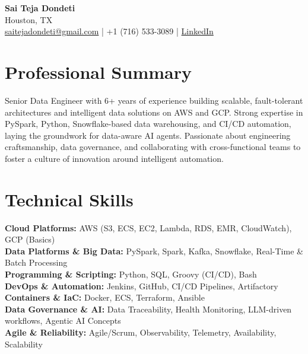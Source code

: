 \documentclass[10pt]{article} %
\begin{document}
\begin{center}
    {\LARGE \textbf{Sai Teja Dondeti}} \\ %
    \vspace{2pt}
    Houston, TX \\ %
    \href{mailto:saitejadondeti@gmail.com}{saitejadondeti@gmail.com} \;|\; %
    +1 (716) 533-3089 \;|\; %
    \href{https://www.linkedin.com/in/sai-teja-dondeti/}{LinkedIn} %
\end{center}

\section*{Professional Summary}
Senior Data Engineer with 6+ years of experience building scalable, fault-tolerant architectures and intelligent data solutions on AWS and GCP. %
Strong expertise in PySpark, Python, Snowflake-based data warehousing, and CI/CD automation, laying the groundwork for data-aware AI agents. %
Passionate about engineering craftsmanship, data governance, and collaborating with cross-functional teams to foster a culture of innovation around intelligent automation. %

\section*{Technical Skills}

\textbf{Cloud Platforms:} AWS (S3, ECS, EC2, Lambda, RDS, EMR, CloudWatch), GCP (Basics) \\ %
\textbf{Data Platforms \& Big Data:} PySpark, Spark, Kafka, Snowflake, Real-Time \& Batch Processing \\ %
\textbf{Programming \& Scripting:} Python, SQL, Groovy (CI/CD), Bash \\ %
\textbf{DevOps \& Automation:} Jenkins, GitHub, CI/CD Pipelines, Artifactory \\ %
\textbf{Containers \& IaC:} Docker, ECS, Terraform, Ansible \\ %
\textbf{Data Governance \& AI:} Data Traceability, Health Monitoring, LLM-driven workflows, Agentic AI Concepts \\
\textbf{Agile \& Reliability:} Agile/Scrum, Observability, Telemetry, Availability, Scalability %
\end{document}
